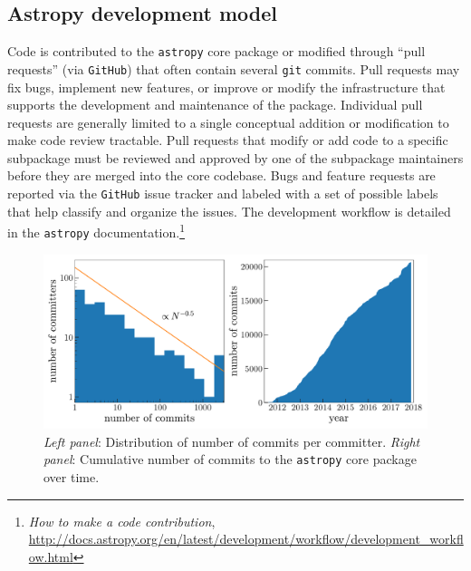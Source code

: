 \documentclass[modern]{aastex61}
\newcommand{\package}[1]{\texttt{#1}\xspace}
\newcommand{\github}{\package{GitHub}}
\newcommand{\astropypkg}{\package{astropy}}
\begin{document}
\subsection{Astropy development model}
Code is contributed to the \astropypkg core package or modified through ``pull
requests'' (via \github) that often contain several \texttt{git} commits.
Pull requests may fix bugs, implement new features, or improve or modify the
infrastructure that supports the development and maintenance of the package.
Individual pull requests are generally limited to a single conceptual addition
or modification to make code review tractable.
Pull requests that modify or add code to a specific subpackage must be reviewed
and approved by one of the subpackage maintainers before they are merged into
the core codebase.
Bugs and feature requests are reported via the \github issue tracker and labeled
with a set of possible labels that help classify and organize the issues.
The development workflow is detailed in the \astropypkg
documentation.\footnote{\emph{How to make a code contribution},
\url{http://docs.astropy.org/en/latest/development/workflow/development_workflow.html}}

\begin{figure}
\includegraphics[width=\textwidth]{ncommits.pdf}
\caption{%
    \emph{Left panel}: Distribution of number of commits per committer.
    \emph{Right panel}: Cumulative number of commits to the \astropypkg core
    package over time.
    \label{fig:ncommits}
}
\end{figure}
\end{document}

